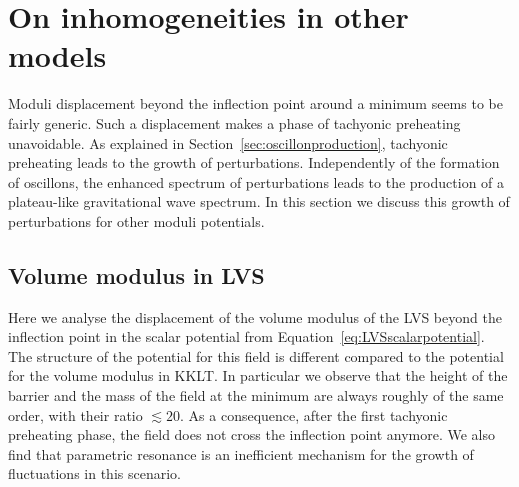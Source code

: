 \documentclass[12pt]{article}
\begin{document}
\appendix
\section{On inhomogeneities in other models}
\label{sec:discussion and other models}


Moduli displacement beyond the inflection point around a minimum seems to be fairly generic. Such a displacement makes a phase of tachyonic preheating unavoidable. As explained in Section~\ref{sec:oscillonproduction}, tachyonic preheating leads to the growth of perturbations. Independently of the formation of oscillons, the enhanced spectrum of perturbations leads to the production of a plateau-like gravitational wave spectrum. In this section we discuss this growth of perturbations for other moduli potentials.


\subsection{Volume modulus in LVS}
\label{sec:LVS}

Here we analyse the displacement of the volume modulus of the LVS beyond the inflection point in the scalar potential from Equation~\eqref{eq:LVSscalarpotential}. The structure of the potential for this field is different compared to the potential for the volume modulus in KKLT. In particular we observe that the height of the barrier and the mass of the field at the minimum are always roughly of the same order, with their ratio $\lesssim 20$. As a consequence, after the first tachyonic preheating phase, the field does not cross the inflection point anymore. We also find that parametric resonance is an inefficient mechanism for the growth of fluctuations in this scenario. 
\end{document}
